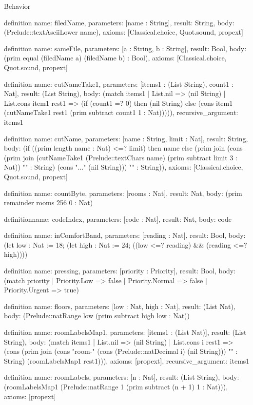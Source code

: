 \begin{lexlean}{Behavior}
\begin{semanticmodule}
definition{
  name: filedName,
  parameters: [name : String],
  result: String,
  body: (Prelude::textAsciiLower name),
  axioms: [Classical.choice, Quot.sound, propext]
}

definition{
  name: sameFile,
  parameters: [a : String, b : String],
  result: Bool,
  body: (prim equal (filedName a) (filedName b) : Bool),
  axioms: [Classical.choice, Quot.sound, propext]
}

definition{
  name: cutNameTake1,
  parameters: [items1 : (List String), count1 : Nat],
  result: (List String),
  body: (match items1
    | List.nil => (nil String)
    | List.cons item1 rest1 => (if (count1 =? 0) then (nil String) else (cons item1 (cutNameTake1 rest1 (prim subtract count1 1 : Nat))))),
  recursive_argument: items1
}

definition{
  name: cutName,
  parameters: [name : String, limit : Nat],
  result: String,
  body: (if ((prim length name : Nat) <=? limit) then name else (prim join (cons (prim join (cutNameTake1 (Prelude::textChars name) (prim subtract limit 3 : Nat)) "" : String) (cons "..." (nil String))) "" : String)),
  axioms: [Classical.choice, Quot.sound, propext]
}

definition{
  name: countByte,
  parameters: [rooms : Nat],
  result: Nat,
  body: (prim remainder rooms 256 0 : Nat)
}

definition{name: codeIndex, parameters: [code : Nat], result: Nat, body: code}

definition{
  name: inComfortBand,
  parameters: [reading : Nat],
  result: Bool,
  body: (let low : Nat := 18; (let high : Nat := 24; ((low <=? reading) && (reading <=? high))))
}

definition{
  name: pressing,
  parameters: [priority : Priority],
  result: Bool,
  body: (match priority
    | Priority.Low => false
    | Priority.Normal => false
    | Priority.Urgent => true)
}

definition{
  name: floors,
  parameters: [low : Nat, high : Nat],
  result: (List Nat),
  body: (Prelude::natRange low (prim subtract high low : Nat))
}

definition{
  name: roomLabelsMap1,
  parameters: [items1 : (List Nat)],
  result: (List String),
  body: (match items1
    | List.nil => (nil String)
    | List.cons i rest1 => (cons (prim join (cons "room-" (cons (Prelude::natDecimal i) (nil String))) "" : String) (roomLabelsMap1 rest1))),
  axioms: [propext],
  recursive_argument: items1
}

definition{
  name: roomLabels,
  parameters: [n : Nat],
  result: (List String),
  body: (roomLabelsMap1 (Prelude::natRange 1 (prim subtract (n + 1) 1 : Nat))),
  axioms: [propext]
}


\end{semanticmodule}
\end{lexlean}
